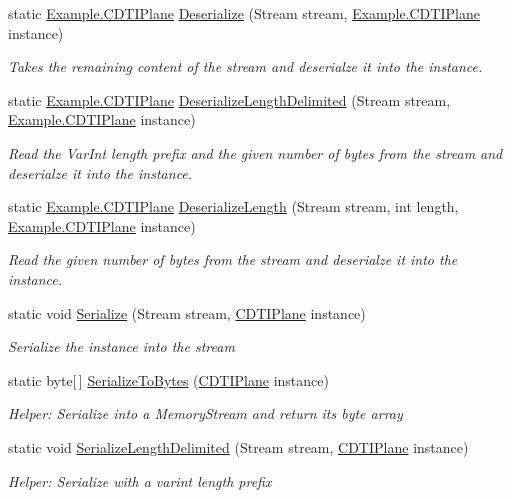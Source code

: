 \begin{DoxyCompactItemize}
static \hyperlink{class_example_1_1_c_d_t_i_plane}{Example.\+C\+D\+T\+I\+Plane} \hyperlink{class_example_1_1_c_d_t_i_plane_ad4231bb21fad192ec5235136c7efc2f3}{Deserialize} (Stream stream, \hyperlink{class_example_1_1_c_d_t_i_plane}{Example.\+C\+D\+T\+I\+Plane} instance)
\begin{DoxyCompactList}\small\item\em Takes the remaining content of the stream and deserialze it into the instance.\end{DoxyCompactList}\item 
static \hyperlink{class_example_1_1_c_d_t_i_plane}{Example.\+C\+D\+T\+I\+Plane} \hyperlink{class_example_1_1_c_d_t_i_plane_ae2f44dc0c44f735cb4d8cc977d5a8e01}{Deserialize\+Length\+Delimited} (Stream stream, \hyperlink{class_example_1_1_c_d_t_i_plane}{Example.\+C\+D\+T\+I\+Plane} instance)
\begin{DoxyCompactList}\small\item\em Read the Var\+Int length prefix and the given number of bytes from the stream and deserialze it into the instance.\end{DoxyCompactList}\item 
static \hyperlink{class_example_1_1_c_d_t_i_plane}{Example.\+C\+D\+T\+I\+Plane} \hyperlink{class_example_1_1_c_d_t_i_plane_a0a9d43348ee794a421d41c1fe66865db}{Deserialize\+Length} (Stream stream, int length, \hyperlink{class_example_1_1_c_d_t_i_plane}{Example.\+C\+D\+T\+I\+Plane} instance)
\begin{DoxyCompactList}\small\item\em Read the given number of bytes from the stream and deserialze it into the instance.\end{DoxyCompactList}\item 
static void \hyperlink{class_example_1_1_c_d_t_i_plane_a56aa1ceb3a4ad073c405dd9fad2bdc57}{Serialize} (Stream stream, \hyperlink{class_example_1_1_c_d_t_i_plane}{C\+D\+T\+I\+Plane} instance)
\begin{DoxyCompactList}\small\item\em Serialize the instance into the stream\end{DoxyCompactList}\item 
static byte\mbox{[}$\,$\mbox{]} \hyperlink{class_example_1_1_c_d_t_i_plane_a6de7c84b310e228f607f6dc5ed9ed3e3}{Serialize\+To\+Bytes} (\hyperlink{class_example_1_1_c_d_t_i_plane}{C\+D\+T\+I\+Plane} instance)
\begin{DoxyCompactList}\small\item\em Helper\+: Serialize into a Memory\+Stream and return its byte array\end{DoxyCompactList}\item 
static void \hyperlink{class_example_1_1_c_d_t_i_plane_a861c8211cc2b5f3bcaf3721dff13435c}{Serialize\+Length\+Delimited} (Stream stream, \hyperlink{class_example_1_1_c_d_t_i_plane}{C\+D\+T\+I\+Plane} instance)
\begin{DoxyCompactList}\small\item\em Helper\+: Serialize with a varint length prefix\end{DoxyCompactList}\end{DoxyCompactItemize}

